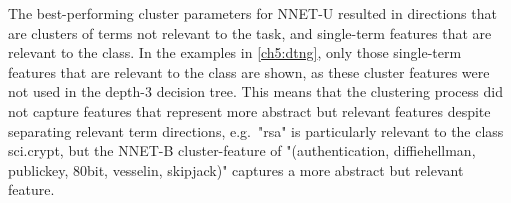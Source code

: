 The best-performing cluster parameters for  NNET-U resulted in directions that are clusters of terms not relevant to the task, and single-term features that are relevant to the class. In the examples in \ref{ch5:dtng}, only those single-term features that are relevant to the class are shown, as these  cluster features were not used in the depth-3 decision tree. This means that the clustering process did not capture features that represent more abstract but relevant features despite separating relevant term directions, e.g.\  "rsa" is particularly relevant to the class sci.crypt, but the NNET-B cluster-feature of  "(authentication, diffiehellman, publickey, 80bit, vesselin, skipjack)" captures a more abstract but relevant feature.  %










